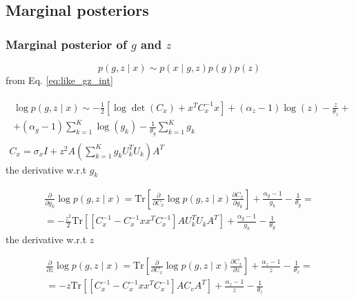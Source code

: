 \documentclass{paper}
\begin{document}
\subsection{Marginal posteriors}

\subsubsection{Marginal posterior of $g$ and $z$}

\begin{equation}
p(g,z \mid x) \sim p(x \mid g,z)p(g)p(z)
\end{equation}
%
from Eq. \ref{eq:like_gz_int}

\begin{eqnarray}
\begin{split}
\log p(g,z \mid x) \sim -\frac{1}{2} \left[ \log \det (C_x) + x^T C_x^{-1} x \right] + (\alpha_z-1)\log(z) - \frac{z}{\theta_z} + \\
+ (\alpha_g-1)\sum_{k=1}^K \log(g_k) - \frac{1}{\theta_g} \sum_{k=1}^K g_k
\end{split} \\
C_x = \sigma_x I + z^2 A \left( \sum_{k=1}^K g_k U_k^T U_k \right)A^T
\end{eqnarray}
%
the derivative w.r.t $g_k$

\begin{equation}
\begin{split}
\frac{\partial}{\partial g_k} \log p(g,z \mid x) = \mathrm{Tr} \left[ \frac{\partial}{\partial C_x} \log p(g,z \mid x) \frac{\partial C_x}{\partial g_k} \right] + \frac{\alpha_g-1}{g_k} - \frac{1}{\theta_g} = \\
= -\frac{z^2}{2} \mathrm{Tr} \left[ \left[ C_x^{-1} - C_x^{-1} xx^T C_x^{-1} \right] AU_k^TU_kA^T \right] + \frac{\alpha_g-1}{g_k} - \frac{1}{\theta_g}
\end{split}
\end{equation}
%
the derivative w.r.t $z$

\begin{equation}
\begin{split}
\frac{\partial}{\partial z} \log p(g,z \mid x) = \mathrm{Tr} \left[ \frac{\partial}{\partial C_x} \log p(g,z \mid x) \frac{\partial C_x}{\partial z} \right] + \frac{\alpha_z-1}{z} - \frac{1}{\theta_z} = \\
= -z \mathrm{Tr} \left[ \left[ C_x^{-1} - C_x^{-1} xx^T C_x^{-1} \right] A C_v A^T \right] + \frac{\alpha_z-1}{z} - \frac{1}{\theta_z}
\end{split}
\end{equation}
\end{document}
